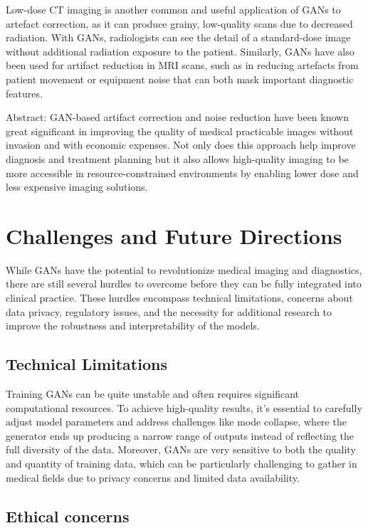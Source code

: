 \documentclass[12pt]{article}
\begin{document}
Low-dose CT imaging is another common and useful application of GANs to artefact correction, as it can produce grainy, low-quality scans due to decreased radiation. With GANs, radiologists can see the detail of a standard-dose image without additional radiation exposure to the patient. Similarly, GANs have also been used for artifact reduction in MRI scans, such as in reducing artefacts from patient movement or equipment noise that can both mask important diagnostic features.

Abstract: GAN-based artifact correction and noise reduction have been known great significant in improving the quality of medical practicable images without invasion and with economic expenses. Not only does this approach help improve diagnosis and treatment planning but it also allows high-quality imaging to be more accessible in resource-constrained environments by enabling lower dose and less expensive imaging solutions.

\section{Challenges and Future Directions}

While GANs have the potential to revolutionize medical imaging and diagnostics, there are still several hurdles to overcome before they can be fully integrated into clinical practice. These hurdles encompass technical limitations, concerns about data privacy, regulatory issues, and the necessity for additional research to improve the robustness and interpretability of the models.

\subsection{Technical Limitations}

Training GANs can be quite unstable and often requires significant computational resources. To achieve high-quality results, it's essential to carefully adjust model parameters and address challenges like mode collapse, where the generator ends up producing a narrow range of outputs instead of reflecting the full diversity of the data. Moreover, GANs are very sensitive to both the quality and quantity of training data, which can be particularly challenging to gather in medical fields due to privacy concerns and limited data availability.

\subsection{Ethical concerns}
\end{document}
